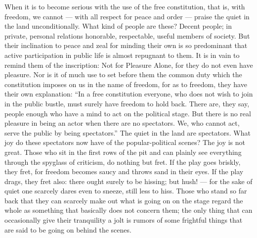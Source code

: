 \documentclass[12pt,a4paper,openany]{book}
\newcommand{\opage}[1]{\marginnote{\footnotesize\textit{[#1]}}}
\begin{document}
When it is to become serious with the use of the
free constitution, that is, with freedom, we cannot --- with all
respect for peace and order --- praise the
quiet in the land unconditionally. What kind of people are these? Decent people;
in private, personal relations honorable, respectable,
useful members of society. But their inclination to
peace and zeal for minding their own is so predominant
that active participation in public life is almost
repugnant to them. It is in vain to remind them
of the inscription: Not for Pleasure Alone, for they do not even
have pleasure. Nor is it of much use to set before
them the common duty which the constitution imposes on us in
the name of freedom, for as to freedom, they have
their own explanation: ``In a free constitution everyone,
who does not wish to join in the public bustle, must surely
have freedom to hold back. There are, they say,
people enough who have a mind to act on the political
stage. But there is no real pleasure in
being an actor when there are no spectators. We, who
cannot act, serve the public by being
spectators.'' The quiet in the land are spectators. What
joy do these spectators now have of the popular-political
scenes? The joy is not great. Those who sit in the first
rows of the pit and can plainly see everything through the spyglass of criticism,
do nothing but fret. If the play goes
briskly, they fret, for freedom becomes saucy and
throws sand in their eyes. If the play drags, they
\setcounter{footnote}{0}%
\opage{64}fret also: there ought surely to be hissing; but hush! ---
for the sake of quiet one scarcely dares even to sneeze,
still less to hiss. Those who stand so far back
that they can scarcely make out what is going on on
the stage regard the whole as something that basically does not
concern them; the only thing that can occasionally give
their tranquility a jolt is rumors of some frightful
things that are said to be going on behind the scenes.
\end{document}
